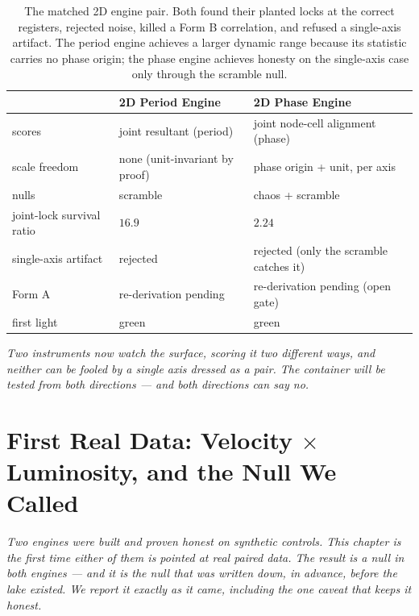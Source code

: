 \documentclass[11pt, letterpaper, openany]{book}
\begin{document}
\begin{table}[H]
\centering
\small
\begin{tabular}{@{}lll@{}}
\toprule
& \textbf{2D Period Engine} & \textbf{2D Phase Engine} \\
\midrule
scores & joint resultant (period) & joint node-cell alignment (phase) \\
scale freedom & none (unit-invariant by proof) & phase origin + unit, per axis \\
nulls & scramble & chaos + scramble \\
joint-lock survival ratio & $16.9$ & $2.24$ \\
single-axis artifact & rejected & rejected (only the scramble catches it) \\
Form A & re-derivation pending & re-derivation pending (open gate) \\
first light & green & green \\
\bottomrule
\end{tabular}
\caption{The matched 2D engine pair. Both found their planted locks at the correct registers,
rejected noise, killed a Form B correlation, and refused a single-axis artifact. The period engine
achieves a larger dynamic range because its statistic carries no phase origin; the phase engine
achieves honesty on the single-axis case only through the scramble null.}
\end{table}

\begin{center}
\vspace{0.5em}
\itshape
Two instruments now watch the surface, scoring it two different ways, and neither can be fooled by a
single axis dressed as a pair. The container will be tested from both directions --- and both
directions can say no.
\vspace{0.5em}
\end{center}


\chapter{First Real Data: Velocity \texorpdfstring{$\times$}{x} Luminosity, and the Null We Called}

\begin{center}
\textit{Two engines were built and proven honest on synthetic controls. This chapter is the first
time either of them is pointed at real paired data. The result is a null in both engines --- and
it is the null that was written down, in advance, before the lake existed. We report it exactly as
it came, including the one caveat that keeps it honest.}
\end{center}
\end{document}
